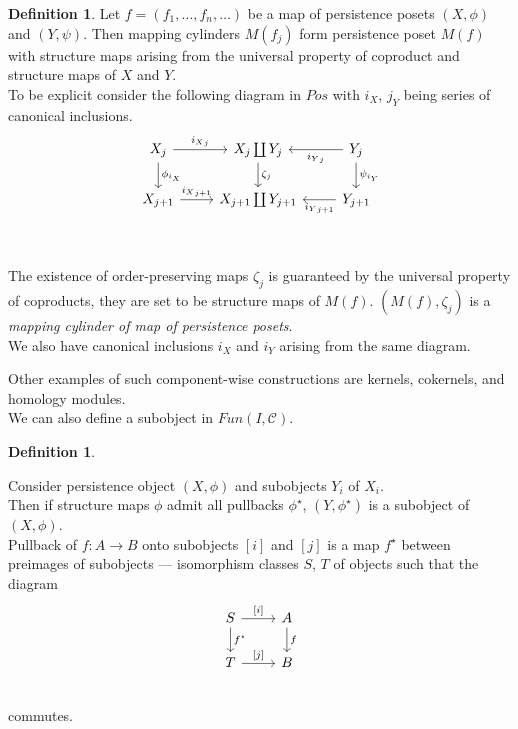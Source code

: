 \documentclass[a4paper, 12pt]{article}
\newcounter{stmcounter}[section]
\numberwithin{equation}{section}
\theoremstyle{definition}
\newtheorem{definition}[stmcounter]{Definition}
\theoremstyle{remark}
\newcommand{\define}[1]{{\textit{#1}}}
\begin{document}
\begin{definition}
  Let $f = (f_1,\ldots,f_n,\ldots)$ be a map of persistence posets $(X, \phi)$ and $(Y, \psi)$. Then mapping cylinders $M(f_j)$ form persistence poset $M(f)$ with structure maps arising from the universal property of coproduct and structure maps of $X$ and $Y$.\\

  To be explicit consider the following diagram in $Pos$ with $i_X$, $j_Y$ being series of canonical inclusions.\\
  \begin{equation}
  \begin{tikzcd}
  X_{j}\arrow{r}{{i_X}_j}\arrow{d}{\phi_{i_X}} & X_j \coprod Y_j\arrow{d}{\zeta_j} & Y_{j}\arrow{l}{{i_Y}_j}\arrow{d}{\psi_{i_Y}} \\
  X_{j+1}\arrow{r}{{i_X}_{j+1}} & X_{j+1} \coprod Y_{j+1} & Y_{j+1}\arrow{l}{{i_Y}_{j+1}} \\
  \end{tikzcd}
  \end{equation}\\

  The existence of order-preserving maps $\zeta_j$ is guaranteed by the universal property of coproducts, they are set to be structure maps of $M(f)$. $(M(f), \zeta_j)$ is a \define{mapping cylinder of map of persistence posets}.\\

  We also have canonical inclusions $i_X$ and $i_Y$ arising from the same diagram.
\end{definition}

Other examples of such component-wise constructions are kernels, cokernels, and homology modules.\\

We can also define a subobject in $Fun(I, \mathcal{C})$.

\begin{definition} ~ \par
  Consider persistence object $(X,\phi)$ and subobjects $Y_i$ of $X_i$.\\

  Then if structure maps $\phi$ admit all pullbacks $\phi^{\star}$, $(Y,\phi^{\star})$ is a subobject of $(X, \phi)$.\\

  Pullback of $f : A \to B$ onto subobjects $[i]$ and $[j]$ is a map $f^{\star}$ between preimages of subobjects --- isomorphism classes $S$, $T$ of objects such that the diagram\\
  \begin{equation}
  \begin{tikzcd}
    S \arrow{d}{f^{\star}}\arrow{r}{[i]} & A\arrow{d}{f} \\
    T \arrow{r}{[j]} & B \\
  \end{tikzcd}
  \end{equation}
  commutes.
\end{definition}
\end{document}
